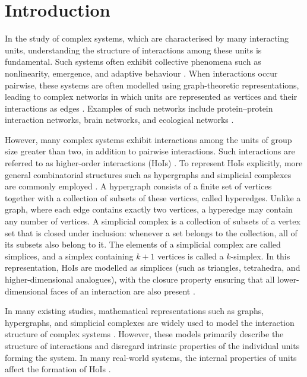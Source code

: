 \documentclass[12pt]{article}
\theoremstyle{normalhead_nobrackets}
\theoremstyle{exampstyle}
\begin{document}
\section{Introduction}
In the study of complex systems, which are characterised by many interacting units, understanding the structure of interactions among these units is fundamental. Such systems often exhibit collective phenomena such as nonlinearity, emergence, and adaptive behaviour \cite{estrada2024complex, raj2024structure, zhao2021simplicial, boccaletti2006complex}. When interactions occur pairwise, these systems are often modelled using graph-theoretic representations, leading to complex networks in which units are represented as vertices and their interactions as edges \cite{newman2018networks, estrada2015first, upadhyay2019network, battiston2021physics, Bianconi_2021}. Examples of such networks include protein–protein interaction networks, brain networks, and ecological networks \cite{newman2018networks}.

However, many complex systems exhibit interactions among the units of group size greater than two, in addition to pairwise interactions. Such interactions are referred to as higher-order interactions (HoIs) \cite{alvarez2021evolutionary, battiston2020networks, boccaletti2023structure, battiston2022higher}. To represent HoIs explicitly, more general combinatorial structures such as hypergraphs and simplicial complexes are commonly employed \cite{salnikov2019simplicial, aktas2019persistence, torres2020simplicial}. A hypergraph consists of a finite set of vertices together with a collection of subsets of these vertices, called hyperedges. Unlike a graph, where each edge contains exactly two vertices, a hyperedge may contain any number of vertices. A simplicial complex is a collection of subsets of a vertex set that is closed under inclusion: whenever a set belongs to the collection, all of its subsets also belong to it. The elements of a simplicial complex are called simplices, and a simplex containing $k+1$ vertices is called a $k$-simplex. In this representation, HoIs are modelled as simplices (such as triangles, tetrahedra, and higher-dimensional analogues), with the closure property ensuring that all lower-dimensional faces of an interaction are also present \cite{kozlov2008combinatorial}.

In many existing studies, mathematical representations such as graphs, hypergraphs, and simplicial complexes are widely used to model the interaction structure of complex systems \cite{boccaletti2023structure,battiston2021physics,battiston2020networks}. However, these models primarily describe the structure of interactions and disregard intrinsic properties of the individual units forming the system. In many real-world systems, the internal properties of units affect the formation of HoIs \cite{miranda2023simplicial}.
\end{document}
